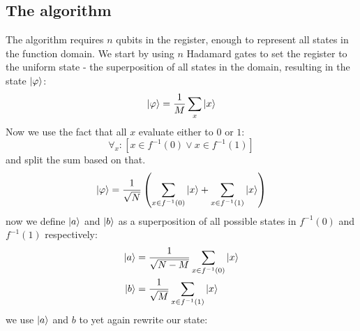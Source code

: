 \subsection{The algorithm}
The algorithm requires $n$ qubits in the register, enough to represent all states in the function domain. We start by using $n$ Hadamard gates to set the register to the uniform state - the superposition of all states in the domain, resulting in the state $\ket{\varphi}$:
$$\ket{\varphi}=\frac{1}{M}\sum_x \ket{x}$$
Now we use the fact that all $x$ evaluate either to $0$ or $1$:
$$\forall_x: \left[x\in f^{-1}(0) \lor x\in f^{-1}(1)\right]$$
and split the sum based on that.
$$\ket{\varphi}=\frac{1}{\sqrt{N}}\left(\sum_{x\in f^{-1}(0)}\ket{x}+\sum_{x\in f^{-1}(1)}\ket{x}\right)$$ 
now we define $\ket{a}$ and $\ket{b}$ as a superposition of all possible states in $f^{-1}(0)$ and $f^{-1}(1)$ respectively: 
\begin{align*}
    \ket{a}&=\frac{1}{\sqrt{N-M}}\sum_{x \in f^{-1}(0)} \ket{x}\\
    \ket{b}&=\frac{1}{\sqrt{M}}\sum_{x \in f^{-1}(1)} \ket{x}
\end{align*}
we use $\ket{a}$ and $b$ to yet again rewrite our state:

